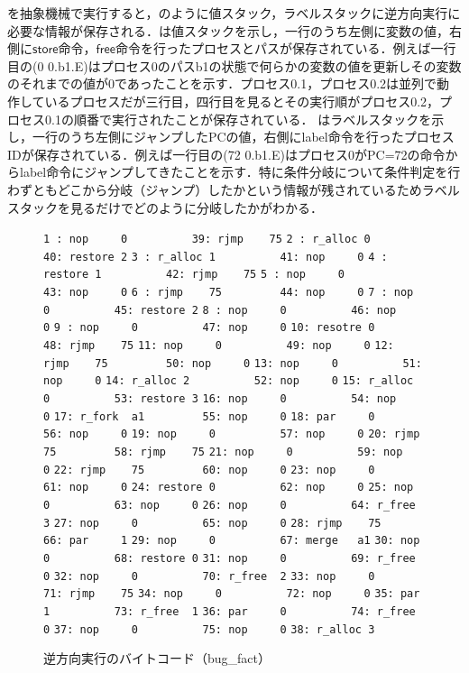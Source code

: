 \documentclass[submit,PRO]{ipsj}
\newcommand{\bcode}[1]{$\mathsf{#1}$}
\def\|{\verb|}
\begin{document}
を抽象機械で実行すると，のように値スタック，ラベルスタックに逆方向実行に必要な情報が保存される．は値スタックを示し，一行のうち左側に変数の値，右側に\bcode{store}命令，\bcode{free}命令を行ったプロセスとパスが保存されている．例えば一行目の(0 0.b1.E)はプロセス0のパスb1の状態で何らかの変数の値を更新しその変数のそれまでの値が0であったことを示す．プロセス0.1，プロセス0.2は並列で動作しているプロセスだが三行目，四行目を見るとその実行順がプロセス0.2，プロセス0.1の順番で実行されたことが保存されている．
はラベルスタックを示し，一行のうち左側にジャンプしたPCの値，右側にlabel命令を行ったプロセスIDが保存されている．例えば一行目の(72 0.b1.E)はプロセス0がPC=72の命令からlabel命令にジャンプしてきたことを示す．特に条件分岐について条件判定を行わずともどこから分岐（ジャンプ）したかという情報が残されているためラベルスタックを見るだけでどのように分岐したかがわかる．






\begin{figure}[tb]
\vbox{
\hbox{\|1 : nop     0          39: rjmp    75|}
\hbox{\|2 : r_alloc 0          40: restore 2|}
\hbox{\|3 : r_alloc 1          41: nop     0|}
\hbox{\|4 : restore 1          42: rjmp    75|}
\hbox{\|5 : nop     0          43: nop     0|}
\hbox{\|6 : rjmp    75         44: nop     0|}
\hbox{\|7 : nop     0          45: restore 2|}
\hbox{\|8 : nop     0          46: nop     0|}
\hbox{\|9 : nop     0          47: nop     0|}
\hbox{\|10: resotre 0          48: rjmp    75|}
\hbox{\|11: nop     0          49: nop     0|}
\hbox{\|12: rjmp    75         50: nop     0|}
\hbox{\|13: nop     0          51: nop     0|}
\hbox{\|14: r_alloc 2          52: nop     0|}
\hbox{\|15: r_alloc 0          53: restore 3|}
\hbox{\|16: nop     0          54: nop     0|}
\hbox{\|17: r_fork  a1         55: nop     0|}
\hbox{\|18: par     0          56: nop     0|}
\hbox{\|19: nop     0          57: nop     0|}
\hbox{\|20: rjmp    75         58: rjmp    75|}
\hbox{\|21: nop     0          59: nop     0|}
\hbox{\|22: rjmp    75         60: nop     0|}
\hbox{\|23: nop     0          61: nop     0|}
\hbox{\|24: restore 0          62: nop     0|}
\hbox{\|25: nop     0          63: nop     0|}
\hbox{\|26: nop     0          64: r_free  3|}
\hbox{\|27: nop     0          65: nop     0|}
\hbox{\|28: rjmp    75         66: par     1|}
\hbox{\|29: nop     0          67: merge   a1|}
\hbox{\|30: nop     0          68: restore 0|}
\hbox{\|31: nop     0          69: r_free  0|}
\hbox{\|32: nop     0          70: r_free  2|}
\hbox{\|33: nop     0          71: rjmp    75|}
\hbox{\|34: nop     0          72: nop     0|}
\hbox{\|35: par     1          73: r_free  1|}
\hbox{\|36: par     0          74: r_free  0|}
\hbox{\|37: nop     0          75: nop     0|}
\hbox{\|38: r_alloc 3         |}
}
\centerline{}
\caption{逆方向実行のバイトコード（bug\_fact）}
\label{fig:backwardfact}
\end{figure}
\end{document}
